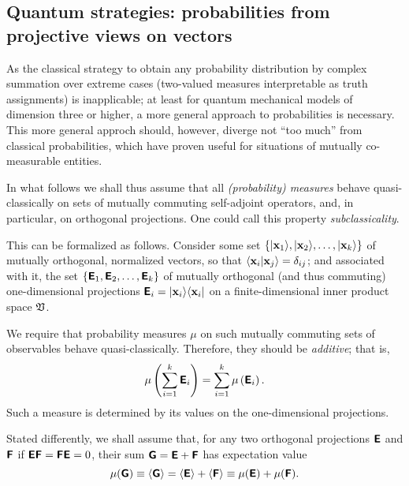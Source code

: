 \newif\ifsup
\ifsup

\subsection{Quantum strategies: probabilities from projective views on vectors}

As the classical strategy to obtain any probability distribution by complex summation over extreme cases (two-valued measures interpretable as truth assignments)
is inapplicable; at least for quantum mechanical models of dimension three or higher,
a more general approach to probabilities is necessary.
This more general approch should, however, diverge not ``too much'' from classical probabilities, which have proven useful for situations of mutually co-measurable entities.


In what follows we shall thus assume that all {\em (probability) measures}
behave quasi-classically on sets of mutually commuting self-adjoint operators,
and, in particular, on orthogonal projections. One could call this property {\em subclassicality}.

This can be formalized as follows.
Consider some set
 $
\{
\vert {\bf x}_1 \rangle ,
\vert {\bf x}_2 \rangle ,
\ldots ,
\vert {\bf x}_k \rangle
\}
$
of mutually orthogonal, normalized vectors,
so that $ \langle {\bf x}_i \vert {\bf x}_j \rangle =\delta_{ij}$;
and associated with it,
the set
 $
\{
\textsf{\textbf{E}}_1,
\textsf{\textbf{E}}_2,
\ldots ,
\textsf{\textbf{E}}_k
\}
$
of mutually orthogonal (and thus commuting) one-dimensional projections
$\textsf{\textbf{E}}_i= \vert {\bf x}_i \rangle \langle {\bf x}_i \vert$
on a finite-dimensional inner product space   ${\frak V}$.

We require that probability measures $\mu$ on such mutually commuting sets of observables behave quasi-classically.
Therefore, they
should be {\em additive}; that is,
\begin{equation}
\mu \left(\sum_{i=1}^k \textsf{\textbf{E}}_i \right)= \sum_{i=1}^k \mu \left(\textsf{\textbf{E}}_i \right)
.
\label{2015-m-fdlvs-ff}
\end{equation}
Such a measure is determined by its values on the one-dimensional projections.

Stated differently, we shall assume that,
for any two orthogonal projections $ \textsf{\textbf{E}}$ and $\textsf{\textbf{F}}$
if
 $ \textsf{\textbf{E}}\textsf{\textbf{F}}= \textsf{\textbf{F}}\textsf{\textbf{E}}=0$,
their sum
 $  \textsf{\textbf{G}} =\textsf{\textbf{E}}+\textsf{\textbf{F}}$
has expectation value
\begin{equation}
\mu ( \textsf{\textbf{G}} ) \equiv
\langle \textsf{\textbf{G}}\rangle =
\langle \textsf{\textbf{E}} \rangle +
\langle \textsf{\textbf{F}} \rangle
\equiv
\mu  ( \textsf{\textbf{E}} ) +
\mu  ( \textsf{\textbf{F}} )
.
\end{equation}

